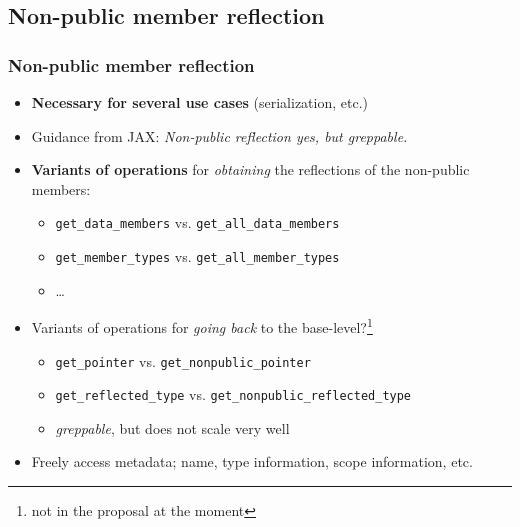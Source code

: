 \documentclass[compress,table,xcolor=table]{beamer}
\begin{document}
\subsection{Non-public member reflection}
\begin{frame}[fragile]
\frametitle{Non-public member reflection}
  \begin{itemize}
    \item \textbf{Necessary for several use cases} (serialization, etc.)
    \item Guidance from JAX: {\em Non-public reflection yes, but {\em greppable}.}
    \item \textbf{Variants of operations} for {\em obtaining} the reflections
      of the non-public members:
    \begin{itemize}
      \footnotesize
      \item \texttt{get\_data\_members} vs. \texttt{\alert{get\_all\_data\_members}}
      \item \texttt{get\_member\_types} vs. \texttt{\alert{get\_all\_member\_types}}
      \item \ldots
    \end{itemize}
    \item Variants of operations for {\em going back} to the base-level?\footnote
     {not in the proposal at the moment}
    \begin{itemize}
      \footnotesize
      \item \texttt{get\_pointer} vs. \texttt{\alert{get\_nonpublic\_pointer}}
      \item \texttt{get\_reflected\_type} vs. \texttt{\alert{get\_nonpublic\_reflected\_type}}
      \item {\em greppable}, but does not scale very well
    \end{itemize}
    \item Freely access metadata; name, type information, scope information, etc.
  \end{itemize}
\end{frame}
\end{document}
